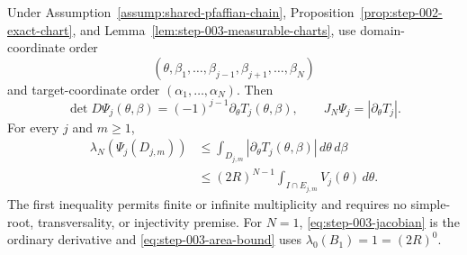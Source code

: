 \begin{proposition}
\label{prop:step-003-area-bound}
Under Assumption~\ref{assump:shared-pfaffian-chain},
Proposition~\ref{prop:step-002-exact-chart}, and
Lemma~\ref{lem:step-003-measurable-charts}, use domain-coordinate order
\[
(\theta,\beta_1,\ldots,\beta_{j-1},\beta_{j+1},\ldots,\beta_N)
\]
and target-coordinate order $(\alpha_1,\ldots,\alpha_N)$.  Then
\begin{equation}
\det D\Psi_j(\theta,\beta)
=(-1)^{j-1}\partial_\theta T_j(\theta,\beta),
\qquad
J_N\Psi_j=|\partial_\theta T_j|.
\label{eq:step-003-jacobian}
\end{equation}
For every $j$ and $m\geq1$,
\begin{equation}
\begin{aligned}
\lambda_N(\Psi_j(D_{j,m}))
&\leq
\int_{D_{j,m}}|\partial_\theta T_j(\theta,\beta)|\,d\theta\,d\beta\\
&\leq
(2R)^{N-1}\int_{I\cap E_{j,m}}V_j(\theta)\,d\theta.
\end{aligned}
\label{eq:step-003-area-bound}
\end{equation}
The first inequality permits finite or infinite multiplicity and requires no
simple-root, transversality, or injectivity premise.  For $N=1$,
\eqref{eq:step-003-jacobian} is the ordinary derivative and
\eqref{eq:step-003-area-bound} uses
$\lambda_0(B_1)=1=(2R)^0$.
\end{proposition}


